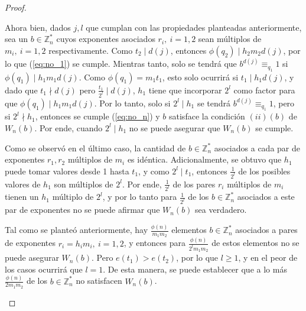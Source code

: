 \documentclass[hidelinks, 12pt]{article}
\newcommand{\Zs}{\mathbb{Z}^*}
\begin{document}
\begin{proof}
\begin{itemize}
        Ahora bien, dados $j,l$ que cumplan con las propiedades planteadas anteriormente, sea un $b\in\Zs_n$ cuyos exponentes asociados $r_i,~i=1,2$ sean múltiplos de $m_i,~i=1,2$ respectivamente. Como $t_2\mid d(j)$, entonces $\phi(q_2)\mid h_2m_2d(j)$, por lo que (\ref{eq:no_1}) se cumple. Mientras tanto, solo se tendrá que $b^{d(j)}\equiv_{q_1}1$ si $\phi(q_1)\mid h_1m_1d(j)$. Como $\phi(q_1)=m_1t_1$, esto solo ocurrirá si $t_1\mid h_1d(j)$, y dado que $t_1\nmid d(j)$ pero $\frac{t_1}{2^l}\mid d(j)$, $h_1$ tiene que incorporar $2^l$ como factor para que $\phi(q_1)\mid h_1m_1d(j)$. Por lo tanto, solo si $2^l\mid h_1$ se tendrá $b^{d(j)}\equiv_{q_1}1$, pero si $2^l\nmid h_1$, entonces se cumple (\ref{eq:no_n}) y $b$ satisface la condición $(ii)(b)$ de $W_n(b)$. Por ende, cuando $2^l\mid h_1$ no se puede asegurar que $W_n(b)$ se cumple.

        Como se observó en el último caso, la cantidad de $b\in\Zs_n$ asociados a cada par de exponentes $r_1,r_2$ múltiplos de $m_i$ es idéntica. Adicionalmente, se obtuvo que $h_1$ puede tomar valores desde 1 hasta $t_1$, y como $2^l\mid t_1$, entonces $\frac{1}{2^l}$ de los posibles valores de $h_1$ son múltiplos de $2^l$. Por ende, $\frac{1}{2^l}$ de los pares $r_i$ múltiplos de $m_i$ tienen un $h_1$ múltiplo de $2^l$, y por lo tanto para $\frac{1}{2^l}$ de los $b\in\Zs_n$ asociados a este par de exponentes no se puede afirmar que $W_n(b)$ sea verdadero.

        Tal como se planteó anteriormente, hay $\frac{\phi(n)}{m_1m_2}$ elementos $b\in\Zs_n$ asociados a pares de exponentes $r_i=h_im_i,~i=1,2$, y entonces para $\frac{\phi(n)}{2^lm_1m_2}$ de estos elementos no se puede asegurar $W_n(b)$. Pero $e(t_1)>e(t_2)$, por lo que $l\geq 1$, y en el peor de los casos ocurrirá que $l=1$. De esta manera, se puede establecer que a lo más $\frac{\phi(n)}{2m_1m_2}$ de los $b\in\Zs_n$ no satisfacen $W_n(b)$.
    \end{itemize}
\end{proof}





\end{document}
